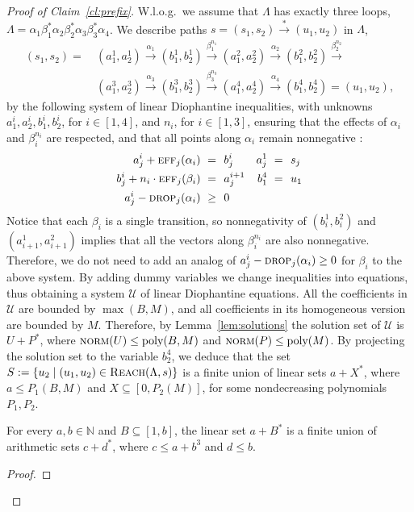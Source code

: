 \documentclass[a4paper, UKenglish, cleveref, autoref, thm-restate]{lipics-v2021}
\newcommand{\N}{\mathbb{N}}
\newcommand{\U}{\mathcal{U}}
\newcommand{\reach}{\textsc{Reach}}
\newcommand{\trans}[1]{\stackrel{#1}{\longrightarrow}}
\newcommand{\tran}{\trans{*}}
\newcommand{\norm}{\textsc{norm}}
\newcommand{\eff}{\textsc{eff}}
\newcommand{\drop}{\textsc{drop}}
\newcommand{\poly}{\textup{poly}}
\newcommand{\setfromto}[2]{[#1, #2]}
\newcommand{\setto}[1]{\setfromto 1 {#1}}
\newcommand{\Wlog}{W.l.o.g.~}
\begin{document}
\begin{appendixproof}
\begin{proof}[Proof of Claim~\ref{cl:prefix}]
\Wlog we assume that $\Lambda$ has exactly three loops, 
$\Lambda = \alpha_1\beta_1^{*}\alpha_2\beta_2^{*}\alpha_3\beta_3^{*}\alpha_4$. 
We describe paths $s = (s_1, s_2) \tran (u_1, u_2)$ in $\Lambda$,
\begin{align*}
(s_1, s_2) = \ & 
(a^1_1, a^1_2) \trans{\alpha_1} (b^1_1, b^1_2) \trans{\beta_1^{n_1}}
(a^2_1, a^2_2) \trans{\alpha_2} (b^2_1, b^2_2) \trans{\beta_2^{n_2}} \\
& (a^3_1, a^3_2) \trans{\alpha_3} (b^3_1, b^3_2) \trans{\beta_3^{n_3}}
(a^4_1, a^4_2) \trans{\alpha_4} (b^4_1, b^4_2) = (u_1, u_2),
\end{align*}
by the following system of linear Diophantine inequalities, with unknowns 
$a^{i}_1, a^{i}_2, b^{i}_1, b^{i}_2$, for $i\in\setto 4$, and $n_i$, for $i\in\setto 3$,
ensuring that the effects of $\alpha_i$ and $\beta_i^{n_i}$ are respected, 
and that all points along $\alpha_i$ remain nonnegative 
:
\begin{align*}
a^{i}_j + \eff_j(\alpha_i) \ = \ & \ b^{i}_j  & a^1_j \ = \ & \ s_j \\
b^{i}_j + n_i \cdot \eff_j(\beta_i) \ = \ & \ a^{i+1}_j & b^4_1 \ = \ & \ u_1 \\
a^i_j - \drop_j(\alpha_i) \ \geq \ & \ 0 
\end{align*}
Notice that each $\beta_i$ is a single transition, so nonnegativity of $(b_i^1, b_i^2)$ and $(a_{i+1}^1, a_{i+1}^2)$
implies that all the vectors along  $\beta_i^{n_i}$ are also nonnegative. Therefore, we do not need to
add an analog of $a^i_j - \drop_j(\alpha_i) \geq 0$ for $\beta_i$ to the above system.
By adding dummy variables we change inequalities into equations,
thus obtaining a system $\U$ of linear Diophantine equations.
All the coefficients in $\U$ are bounded by $\max(B, M)$, 
and all coefficients in its homogeneous version are bounded by $M$.
Therefore, by Lemma~\ref{lem:solutions} the solution set of $\U$ is $U+P^*$,
where $\norm(U) \leq \poly(B,M)$ and $\norm(P) \leq \poly(M)$.
By projecting the solution set to the variable $b^4_2$, we deduce that
the set $S:=\{u_2 \mid (u_1, u_2) \in \reach(\Lambda,s)\}$ is a finite union of 
linear sets $a+X^*$, where $a \leq P_1(B,M)$ and $X \subseteq [0,P_2(M)]$,
for some nondecreasing polynomials $P_1, P_2$.
\begin{claim}\label{cl:linear-1dim}
For every $a,b \in \N$ and $B \subseteq [1,b]$, the linear set $a+B^*$ is a finite union
of arithmetic sets $c + d^*$, where $c \leq a+b^3$ and $d \leq b$.
\end{claim}
\begin{proof}

\end{proof}
\end{proof}
\end{appendixproof}
\end{document}
